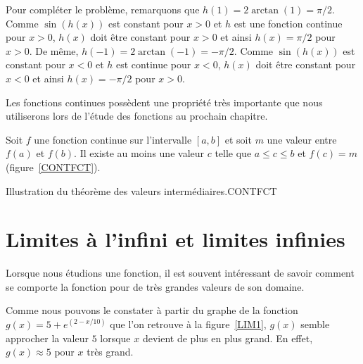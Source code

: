 {\begin{egg}[\theory]
Pour compléter le problème, remarquons que
$h(1) = 2\arctan(1) = \pi/2$.  Comme $\sin(h(x))$ est constant pour
$x>0$ et $h$ est une fonction continue pour $x>0$, $h(x)$ doit être
constant pour $x>0$ et ainsi $h(x) = \pi/2$ pour $x>0$.  De même,
$h(-1) = 2\arctan(-1) = -\pi/2$.  Comme $\sin(h(x))$ est constant pour
$x<0$ et $h$ est continue pour $x<0$, $h(x)$ doit être constant pour
$x<0$ et ainsi $h(x) = -\pi/2$ pour $x>0$.
\end{egg}



Les fonctions continues possèdent une propriété très importante que
nous utiliserons lors de l'étude des fonctions au prochain chapitre.

\begin{theorem}
Soit $f$ une fonction continue sur l'intervalle $[a,b]$ et soit $m$
une valeur entre $f(a)$ et $f(b)$.  Il existe au moins une valeur $c$
telle que  $a\leq c \leq b$ et $f(c) = m$ (figure~\ref{CONTFCT}).
\label{TVI}
\end{theorem}

{Illustration du théorème des valeurs intermédiaires.}{CONTFCT}

\section{Limites à l'infini et limites infinies}

Lorsque nous étudions une fonction, il est souvent intéressant de savoir
comment se comporte la fonction pour de très grandes valeurs de son
domaine.

\begin{egg}
Comme nous pouvons le constater à partir du graphe de la fonction
$\displaystyle g(x) = 5 + e^{(2 - x/10)}$ que l'on retrouve à la
figure~\ref{LIM1}, $g(x)$ semble approcher la valeur $5$ lorsque $x$
devient de plus en plus grand.  En effet, $g(x) \approx 5$ pour $x$
très grand.
\end{egg}

}
